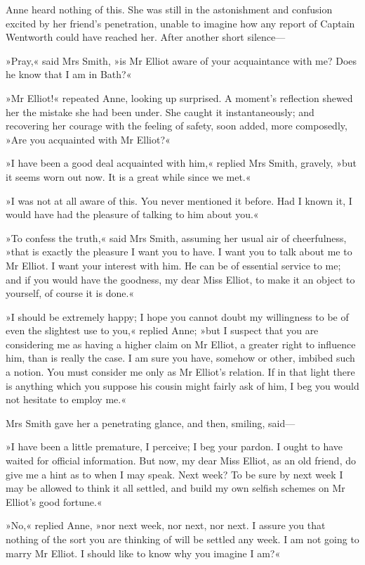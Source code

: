 Anne heard nothing of this. She was still in the astonishment and confusion excited by her friend's penetration, unable to imagine how any report of Captain Wentworth could have reached her. After another short silence—

»Pray,« said Mrs Smith, »is Mr Elliot aware of your acquaintance with me? Does he know that I am in Bath?«

»Mr Elliot!« repeated Anne, looking up surprised. A moment's reflection shewed her the mistake she had been under. She caught it instantaneously; and recovering her courage with the feeling of safety, soon added, more composedly, »Are you acquainted with Mr Elliot?«

»I have been a good deal acquainted with him,« replied Mrs Smith, gravely, »but it seems worn out now. It is a great while since we met.«

»I was not at all aware of this. You never mentioned it before. Had I known it, I would have had the pleasure of talking to him about you.«

»To confess the truth,« said Mrs Smith, assuming her usual air of cheerfulness, »that is exactly the pleasure I want you to have. I want you to talk about me to Mr Elliot. I want your interest with him. He can be of essential service to me; and if you would have the goodness, my dear Miss Elliot, to make it an object to yourself, of course it is done.«

»I should be extremely happy; I hope you cannot doubt my willingness to be of even the slightest use to you,« replied Anne; »but I suspect that you are considering me as having a higher claim on Mr Elliot, a greater right to influence him, than is really the case. I am sure you have, somehow or other, imbibed such a notion. You must consider me only as Mr Elliot's relation. If in that light there is anything which you suppose his cousin might fairly ask of him, I beg you would not hesitate to employ me.«

Mrs Smith gave her a penetrating glance, and then, smiling, said—

»I have been a little premature, I perceive; I beg your pardon. I ought to have waited for official information. But now, my dear Miss Elliot, as an old friend, do give me a hint as to when I may speak. Next week? To be sure by next week I may be allowed to think it all settled, and build my own selfish schemes on Mr Elliot's good fortune.«

»No,« replied Anne, »nor next week, nor next, nor next. I assure you that nothing of the sort you are thinking of will be settled any week. I am not going to marry Mr Elliot. I should like to know why you imagine I am?«

